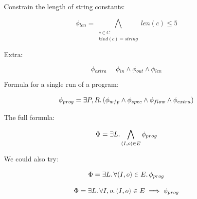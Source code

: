 Constrain the length of string constants:

\[
  \phi{}_{len} = \bigwedge_{\substack{c \in C \\ kind(c) = string}} len(c) \leq 5
\]

Extra:

\[ \phi{}_{extra} = \phi{}_{in} \wedge \phi{}_{out} \wedge \phi{}_{len} \]

Formula for a single run of a program:

\begin{align*}
  \phi{}_{prog} = \exists P,R\ldotp (\phi{}_{wfp} \wedge \phi{}_{spec} \wedge
  \phi{}_{flow} \wedge \phi{}_{extra})
\end{align*}

The full formula:

\[
  \Phi{} = \exists L\ldotp \bigwedge_{(I, o) \in E}\phi{}_{prog}
\]

We could also try:

\[
  \Phi{} = \exists L\ldotp \forall (I, o) \in E \ldotp \phi{}_{prog}
\]

\[
  \Phi{} = \exists L\ldotp \forall I, o \ldotp (I, o) \in E \implies \phi{}_{prog}
\]



